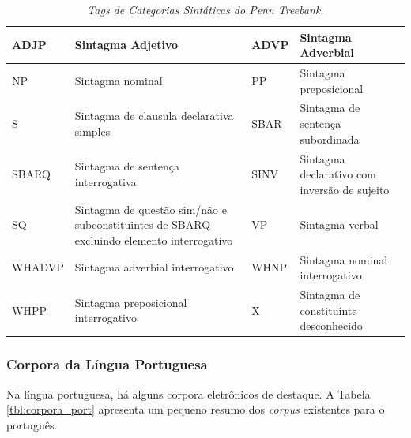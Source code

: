 \begin{table}
   \centering
   \small
   \caption{\it Tags de Categorias Sintáticas do \emph{Penn Treebank}.}

   \begin{tabular}{ | p{2cm} | p{4cm} | p{2cm} | p{4cm} |}

   \hline
		ADJP & Sintagma Adjetivo 	& 	ADVP & Sintagma Adverbial\\
   \hline
		NP & Sintagma nominal 	& 	PP & Sintagma preposicional\\
   \hline
		S & Sintagma de clausula declarativa simples 	& 	SBAR & Sintagma de sentença subordinada\\
   \hline
		SBARQ & Sintagma de sentença interrogativa 	& 	SINV & Sintagma declarativo com inversão de sujeito\\
   \hline
		SQ & Sintagma de questão sim/não e subconstituintes de SBARQ excluindo elemento interrogativo 	& 	 VP & Sintagma verbal\\
   \hline
		WHADVP & Sintagma adverbial interrogativo 	& 	WHNP & Sintagma nominal interrogativo\\
   \hline
		WHPP & Sintagma preposicional interrogativo &    	X & Sintagma de constituinte desconhecido \\
	\hline

   \end{tabular}
   \label{tbl:penn_treebank_cats}
\end{table}

\subsubsection{Corpora da Língua Portuguesa}
\label{sub:corpus_portugues}

Na língua portuguesa, há alguns corpora eletrônicos de destaque. A Tabela \ref{tbl:corpora_port} apresenta um pequeno resumo dos \emph{corpus} existentes para o português.

